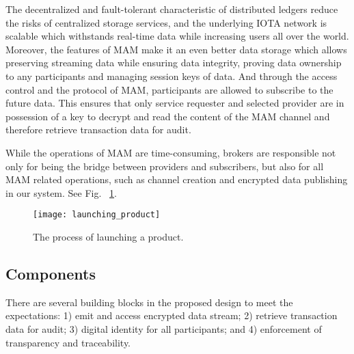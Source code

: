 The decentralized and fault-tolerant characteristic of distributed ledgers reduce the risks of centralized storage services, and the underlying IOTA network is scalable which withstands real-time data while increasing users all over the world. Moreover, the features of MAM make it an even better data storage which allows preserving streaming data while ensuring data integrity, proving data ownership to any participants and managing session keys of data. And through the access control and the protocol of MAM, participants are allowed to subscribe to the future data. This ensures that only service requester and selected provider are in possession of a key to decrypt and read the content of the MAM channel and therefore retrieve transaction data for audit.

While the operations of MAM are time-consuming, brokers are responsible not only for being the bridge between providers and subscribers, but also for all MAM related operations, such as channel creation and encrypted data publishing in our system. See Fig.~ \ref{fig:launching_product}.

\begin{figure}[!t]
    \centering
    \texttt{[image: launching\_product]}
    \caption{The process of launching a product.}
    \label{fig:launching_product}
\end{figure}


\subsection{Components}
There are several building blocks in the proposed design to meet the expectations: 1) emit and access encrypted data stream; 2) retrieve transaction data for audit; 3) digital identity for all participants; and 4) enforcement of transparency and traceability.


